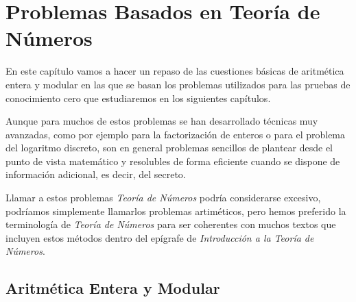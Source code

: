 \chapter{Problemas Basados en Teor\'ia de N\'umeros}\label{ch:preliminaresAlgebra}






En este cap\'itulo vamos a hacer un repaso de las cuestiones b\'asicas de
aritm\'etica entera y modular en las que se basan los problemas utilizados
para las pruebas de conocimiento cero que estudiaremos en los siguientes
cap\'itulos.

Aunque para muchos de estos problemas se han desarrollado t\'ecnicas muy
avanzadas, como por ejemplo para la factorizaci\'on de enteros o para el
problema del logaritmo discreto, son en general problemas sencillos de
plantear desde el punto de vista matem\'atico y resolubles de forma
eficiente cuando se dispone de informaci\'on adicional, es decir, del
secreto.

Llamar a estos problemas {\em Teor\'ia de N\'umeros} podr\'ia considerarse
excesivo, podr\'iamos simplemente llamarlos problemas artim\'eticos, pero
hemos preferido la terminolog\'ia de {\em Teor\'ia de N\'umeros} para ser
coherentes con muchos textos que incluyen estos m\'etodos dentro del
ep\'igrafe de {\em Introducci\'on a la Teor\'ia de N\'umeros}.

\section{Aritm\'etica Entera y Modular}

